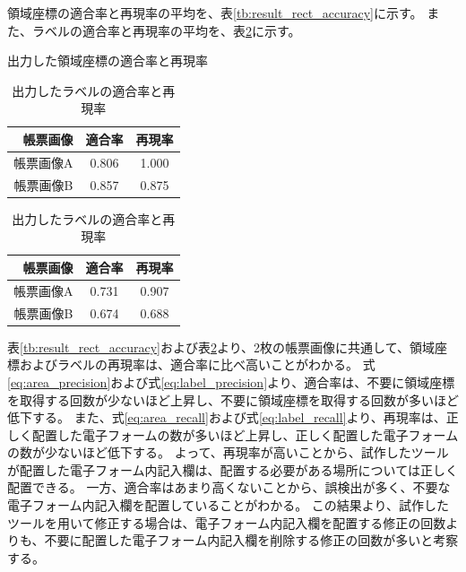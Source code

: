 領域座標の適合率と再現率の平均を、表\ref{tb:result_rect_accuracy}に示す。
また、ラベルの適合率と再現率の平均を、表\ref{tb:result_label_accuracy}に示す。
\begin{table}[tp]
    \centering
    \begin{minipage}[h]{0.47\linewidth}
        \caption{出力した領域座標の適合率と再現率}
        \label{tb:result_rect_accuracy}
        \centering
        \begin{tabular}{r|c|c}
            帳票画像 & 適合率 & 再現率 \\
            \hline \hline
            帳票画像A & 0.806 & 1.000 \\
            帳票画像B & 0.857 & 0.875 \\
        \end{tabular}
    \end{minipage}
    \begin{minipage}[h]{0.47\linewidth}
        \caption{出力したラベルの適合率と再現率}
        \label{tb:result_label_accuracy}
        \centering
        \begin{tabular}{r|c|c}
            帳票画像 & 適合率 & 再現率 \\
            \hline \hline
            帳票画像A & 0.731 & 0.907 \\
            帳票画像B & 0.674 & 0.688 \\
        \end{tabular}
    \end{minipage}
\end{table}
表\ref{tb:result_rect_accuracy}および表\ref{tb:result_label_accuracy}より、2枚の帳票画像に共通して、領域座標およびラベルの再現率は、適合率に比べ高いことがわかる。
式\ref{eq:area_precision}および式\ref{eq:label_precision}より、適合率は、不要に領域座標を取得する回数が少ないほど上昇し、不要に領域座標を取得する回数が多いほど低下する。
また、式\ref{eq:area_recall}および式\ref{eq:label_recall}より、再現率は、正しく配置した電子フォームの数が多いほど上昇し、正しく配置した電子フォームの数が少ないほど低下する。
よって、再現率が高いことから、試作したツールが配置した電子フォーム内記入欄は、配置する必要がある場所については正しく配置できる。
一方、適合率はあまり高くないことから、誤検出が多く、不要な電子フォーム内記入欄を配置していることがわかる。
この結果より、試作したツールを用いて修正する場合は、電子フォーム内記入欄を配置する修正の回数よりも、不要に配置した電子フォーム内記入欄を削除する修正の回数が多いと考察する。


